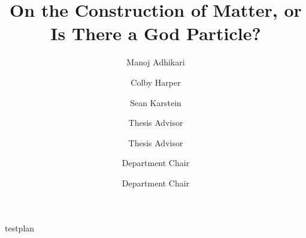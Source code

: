 \documentclass{scu-thesis}
\author{Manoj Adhikari}
\author{Colby Harper}
\author{Sean Karstein}
\title{On the Construction of Matter, or Is There a God Particle?}
\begin{document}
\frontmatter
\signature{Thesis Advisor}
\signature{Thesis Advisor}
\signature{Department Chair}
\signature{Department Chair}

\maketitle


\tableofcontents
\listoffigures

\mainmatter
















 {testplan}







\backmatter
\end{document}
